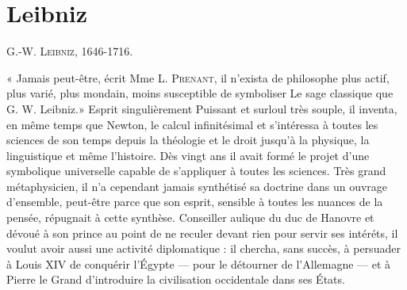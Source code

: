 
\chapter{Leibniz}

 

G.-W. \textsc{Leibniz}, 1646-1716.

« Jamais peut-être, écrit Mme L. \textsc{Prenant},
il n'exista de philosophe plus actif, plus
varié, plus mondain, moins susceptible
de symboliser Le sage classique que
G. W. Leibniz.» Esprit singulièrement
Puissant et surloul très souple, il inventa,
en même temps que Newton, le calcul
infinitésimal et s'intéressa à toutes les
sciences de son temps depuis la théologie
et le droit jusqu'à la physique, la linguistique et même l'histoire. Dès vingt ans
il avait formé le projet d'une symbolique
universelle capable de s'appliquer à
toutes les sciences. Très grand métaphysicien, il n'a cependant jamais
synthétisé sa doctrine dans un ouvrage d'ensemble, peut-être parce que son esprit,
sensible à toutes les nuances de la pensée,
répugnait à cette synthèse. Conseiller
aulique du duc de Hanovre et dévoué
à son prince au point de ne reculer devant
rien pour servir ses intéréts, il voulut
avoir aussi une activité diplomatique : il
chercha, sans succès, à persuader à
Louis XIV de conquérir l'Égypte —
pour le détourner de l'Allemagne — et
à Pierre le Grand d'introduire la civilisation occidentale dans ses États.

